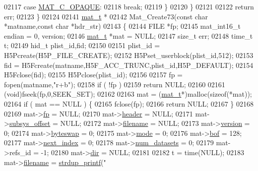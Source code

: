 \begin{DoxyCode}
{{{{{{02117             \textcolor{keywordflow}{case} \hyperlink{group___m_a_t_ggad4d60ae7b709fc81bfd744fb4c857c40ad83c684d250e463c1a3779647695c0c9}{MAT\_C\_OPAQUE}:
02118                 \textcolor{keywordflow}{break};
02119         \}
02120     \}
02121 
02122     \textcolor{keywordflow}{return} err;
02123 \}
02124 
02141 \hyperlink{struct__mat__t}{mat\_t} *
02142 Mat\_Create73(\textcolor{keyword}{const} \textcolor{keywordtype}{char} *matname,\textcolor{keyword}{const} \textcolor{keywordtype}{char} *hdr\_str)
02143 \{
02144     FILE *fp;
02145     mat\_int16\_t endian = 0, version;
02146     \hyperlink{struct__mat__t}{mat\_t} *mat = NULL;
02147     \textcolor{keywordtype}{size\_t} err;
02148     time\_t t;
02149     hid\_t plist\_id,fid;
02150 
02151     plist\_id = H5Pcreate(H5P\_FILE\_CREATE);
02152     H5Pset\_userblock(plist\_id,512);
02153     fid = H5Fcreate(matname,H5F\_ACC\_TRUNC,plist\_id,H5P\_DEFAULT);
02154     H5Fclose(fid);
02155     H5Pclose(plist\_id);
02156 
02157     fp = fopen(matname,\textcolor{stringliteral}{"r+b"});
02158     \textcolor{keywordflow}{if} ( !fp )
02159         \textcolor{keywordflow}{return} NULL;
02160 
02161     (void)fseek(fp,0,SEEK\_SET);
02162 
02163     mat = (\hyperlink{struct__mat__t}{mat\_t}*)malloc(\textcolor{keyword}{sizeof}(*mat));
02164     \textcolor{keywordflow}{if} ( mat == NULL ) \{
02165         fclose(fp);
02166         \textcolor{keywordflow}{return} NULL;
02167     \}
02168 
02169     mat->\hyperlink{struct__mat__t_a85f562e407ca9ad4d2a6e14f839432b7}{fp}            = NULL;
02170     mat->\hyperlink{struct__mat__t_a5ed5d0e4e3c4d76b626a8a1772d579c4}{header}        = NULL;
02171     mat->\hyperlink{struct__mat__t_a19317c01209959d755d69311960d3eec}{subsys\_offset} = NULL;
02172     mat->\hyperlink{struct__mat__t_a340b191598135edd03b6dec847f0b1b1}{filename}      = NULL;
02173     mat->\hyperlink{struct__mat__t_a729c2bc0afc97485057a5af425635b1a}{version}       = 0;
02174     mat->\hyperlink{struct__mat__t_a99d207977af5e04941ace56d71817a40}{byteswap}      = 0;
02175     mat->\hyperlink{struct__mat__t_aa43288b63b8edb7cadf0b79e2d1df2ee}{mode}          = 0;
02176     mat->\hyperlink{struct__mat__t_a0f87794a6113bd568fe591953e20ddf3}{bof}           = 128;
02177     mat->\hyperlink{struct__mat__t_a0163a12f9735356723bb604992639d9e}{next\_index}    = 0;
02178     mat->\hyperlink{struct__mat__t_af37d0ba323e65edb27ecd5a2f766a3a4}{num\_datasets}  = 0;
02179     mat->refs\_id       = -1;
02180     mat->\hyperlink{struct__mat__t_a1bc6c604459d0787801d5e53d365684c}{dir}           = NULL;
02181 
02182     t = time(NULL);
02183     mat->\hyperlink{struct__mat__t_a340b191598135edd03b6dec847f0b1b1}{filename} = \hyperlink{group__mat__util_ga291b08f933c75fb70e3736b669896ebd}{strdup\_printf}(\textcolor{stringliteral}{"%
}}}}}}}
\end{DoxyCode}
